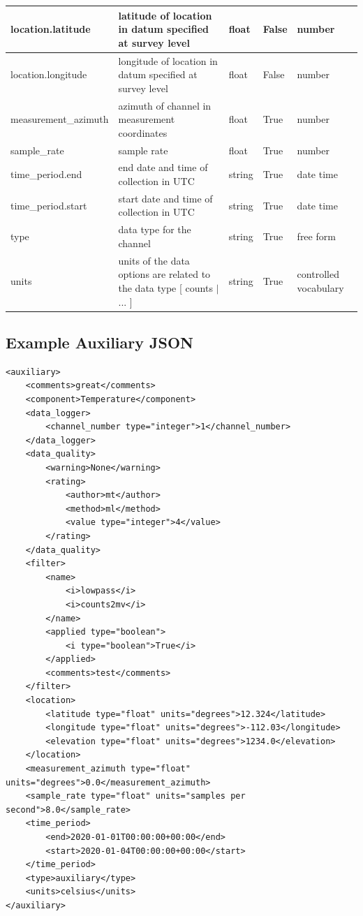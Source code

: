 \documentclass{article}
\begin{document}
\begin{table}[htb!]
\begin{tabular}{|l|p{2.75in}|l|l|p{.95in}|}
        location.latitude & latitude of location in datum specified at survey level & float & False & number  \\ \hline
        location.longitude & longitude of location in datum specified at survey level & float & False & number  \\ \hline
        measurement\_azimuth & azimuth of channel in measurement coordinates & float & True & number  \\ \hline
        sample\_rate & sample rate & float & True & number  \\ \hline
        time\_period.end & end date and time of collection in UTC & string & True & date time  \\ \hline
        time\_period.start & start date and time of collection in UTC & string & True & date time  \\ \hline
        type & data type for the channel & string & True & free form  \\ \hline
        units & units of the data options are related to the data type [ counts $|$ ... ] & string & True & controlled vocabulary \\ \hline
    \end{tabular}
    \label{tab:aux}
\end{table}

\newpage
\subsection{Example Auxiliary JSON} 

\begin{verbatim}
<auxiliary>
    <comments>great</comments>
    <component>Temperature</component>
    <data_logger>
        <channel_number type="integer">1</channel_number>
    </data_logger>
    <data_quality>
        <warning>None</warning>
        <rating>
            <author>mt</author>
            <method>ml</method>
            <value type="integer">4</value>
        </rating>
    </data_quality>
    <filter>
        <name>
            <i>lowpass</i>
            <i>counts2mv</i>
        </name>
        <applied type="boolean">
            <i type="boolean">True</i>
        </applied>
        <comments>test</comments>
    </filter>
    <location>
        <latitude type="float" units="degrees">12.324</latitude>
        <longitude type="float" units="degrees">-112.03</longitude>
        <elevation type="float" units="degrees">1234.0</elevation>
    </location>
    <measurement_azimuth type="float" units="degrees">0.0</measurement_azimuth>
    <sample_rate type="float" units="samples per second">8.0</sample_rate>
    <time_period>
        <end>2020-01-01T00:00:00+00:00</end>
        <start>2020-01-04T00:00:00+00:00</start>
    </time_period>
    <type>auxiliary</type>
    <units>celsius</units>
</auxiliary>
\end{verbatim}
\end{document}
